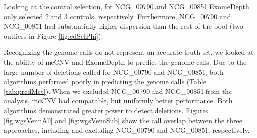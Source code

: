 \documentclass[11pt,letterpaper]{book}
\begin{document}
Looking at the control selection, for NCG\_00790 and NCG\_00851 ExomeDepth only selected 2 and 3 controls, respectively.
Furthermore, NCG\_00790 and NCG\_00851 had substantially higher dispersion than the rest of the pool (two outliers in Figure \ref{fig:edSelPhi}).

Recognizing the genome calls do not represent an accurate truth set, we looked at the ability of mcCNV and ExomeDepth to predict the genome calls.
Due to the large number of deletions called for NCG\_00790 and NCG\_00851, both algorithms performed poorly in predicting the genome calls (Table \ref{tab:predMet}).
When we excluded NCG\_00790 and NCG\_00851 from the analysis, mcCNV had comparable, but uniformly better performance.
Both algorithms demonstrated greater power to detect deletions.
Figures \ref{fig:wgsVennAll} and \ref{fig:wgsVennSub} show the call overlap between the three approaches, including and excluding NCG\_00790 and NCG\_00851, respectively.
\end{document}
